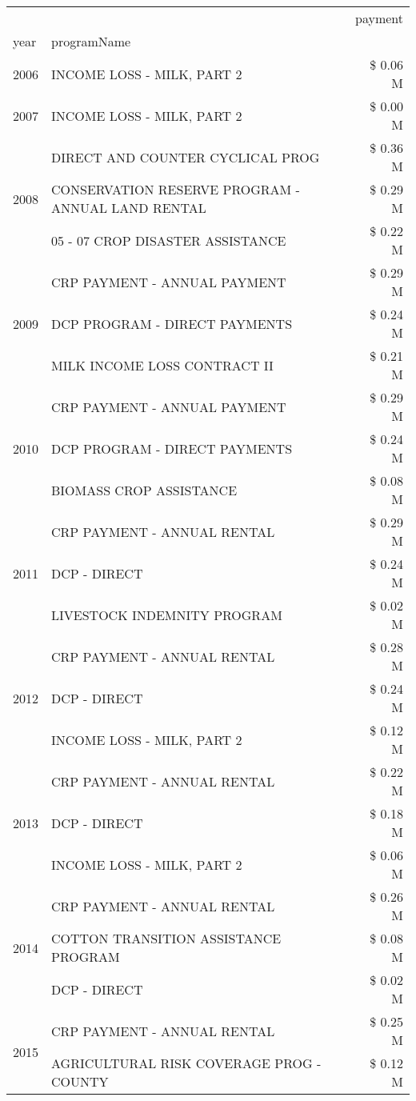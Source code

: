 \begin{tabular}{llr}
\toprule
 &  & payment \\
year & programName &  \\
\midrule
2006 & INCOME LOSS - MILK, PART 2 & \$ 0.06 M \\
\cline{1-3}
2007 & INCOME LOSS - MILK, PART 2 & \$ 0.00 M \\
\cline{1-3}
\multirow[t]{3}{*}{2008} & DIRECT AND COUNTER CYCLICAL PROG & \$ 0.36 M \\
 & CONSERVATION RESERVE PROGRAM - ANNUAL LAND RENTAL & \$ 0.29 M \\
 & 05 - 07 CROP DISASTER ASSISTANCE & \$ 0.22 M \\
\cline{1-3}
\multirow[t]{3}{*}{2009} & CRP PAYMENT - ANNUAL PAYMENT & \$ 0.29 M \\
 & DCP PROGRAM - DIRECT PAYMENTS & \$ 0.24 M \\
 & MILK INCOME LOSS CONTRACT II & \$ 0.21 M \\
\cline{1-3}
\multirow[t]{3}{*}{2010} & CRP PAYMENT - ANNUAL PAYMENT & \$ 0.29 M \\
 & DCP PROGRAM - DIRECT PAYMENTS & \$ 0.24 M \\
 & BIOMASS CROP ASSISTANCE & \$ 0.08 M \\
\cline{1-3}
\multirow[t]{3}{*}{2011} & CRP PAYMENT - ANNUAL RENTAL & \$ 0.29 M \\
 & DCP - DIRECT & \$ 0.24 M \\
 & LIVESTOCK INDEMNITY PROGRAM & \$ 0.02 M \\
\cline{1-3}
\multirow[t]{3}{*}{2012} & CRP PAYMENT - ANNUAL RENTAL & \$ 0.28 M \\
 & DCP - DIRECT & \$ 0.24 M \\
 & INCOME LOSS - MILK, PART 2 & \$ 0.12 M \\
\cline{1-3}
\multirow[t]{3}{*}{2013} & CRP PAYMENT - ANNUAL RENTAL & \$ 0.22 M \\
 & DCP - DIRECT & \$ 0.18 M \\
 & INCOME LOSS - MILK, PART 2 & \$ 0.06 M \\
\cline{1-3}
\multirow[t]{3}{*}{2014} & CRP PAYMENT - ANNUAL RENTAL & \$ 0.26 M \\
 & COTTON TRANSITION ASSISTANCE PROGRAM & \$ 0.08 M \\
 & DCP - DIRECT & \$ 0.02 M \\
\cline{1-3}
\multirow[t]{3}{*}{2015} & CRP PAYMENT - ANNUAL RENTAL & \$ 0.25 M \\
 & AGRICULTURAL RISK COVERAGE PROG - COUNTY & \$ 0.12 M \\

\end{tabular}
